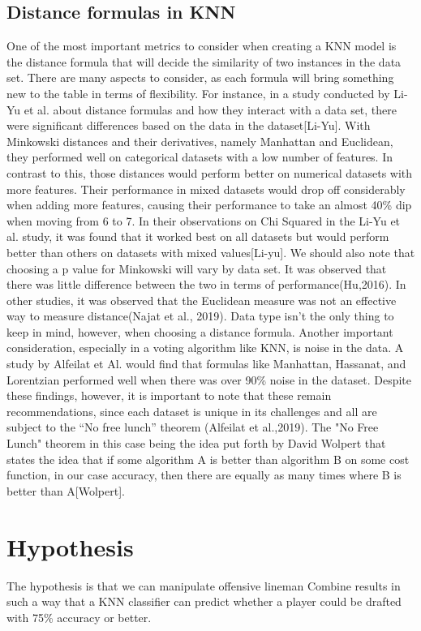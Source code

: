 \documentclass[confrence]{IEEEtran}
\begin{document}
\subsection*{Distance formulas in KNN}
One of the most important metrics to consider when creating a KNN model is the distance formula that will decide the similarity of two instances in the data set.
There are many aspects to consider, as each formula will bring something new to the table in terms of flexibility. For instance, in a study conducted by Li-Yu et al. about distance formulas and how they interact with a data set, there were significant differences based on the data in the dataset[Li-Yu].
With Minkowski distances and their derivatives, namely Manhattan and Euclidean, they performed well on categorical datasets with a low number of features. 
In contrast to this, those distances would perform better on numerical datasets with more features.
Their performance in mixed datasets would drop off considerably when adding more features, causing their performance to take an almost 40\% dip when moving from 6 to 7.
In their observations on Chi Squared in the Li-Yu et al. study, it was found that it worked best on all datasets but would perform better than others on datasets with mixed values[Li-yu].
We should also note that choosing a p value for Minkowski will vary by data set. It was observed that there was little difference between the two in terms of performance(Hu,2016).
In other studies, it was observed that the Euclidean measure was not an effective way to measure distance(Najat et al., 2019). Data type isn't the only thing to keep in mind, however, when choosing a distance formula.
Another important consideration, especially in a voting algorithm like KNN, is noise in the data. A study by Alfeilat et Al. would find that formulas like Manhattan, Hassanat, and Lorentzian performed well when there was over 90\% noise in the dataset.
Despite these findings, however, it is important to note that these remain recommendations, since each dataset is unique in its challenges and all are subject to the “No free lunch” theorem (Alfeilat et al.,2019).
The "No Free Lunch" theorem in this case being the idea put forth by David Wolpert that states the idea that if some algorithm A is better than algorithm B on some cost function, in our case accuracy, then there are equally as many times where B is better than A[Wolpert].
\section*{Hypothesis}
The hypothesis is that we can manipulate offensive lineman Combine results in such a way that a KNN classifier can predict whether a player could be drafted with 75\% accuracy or better.
\end{document}
